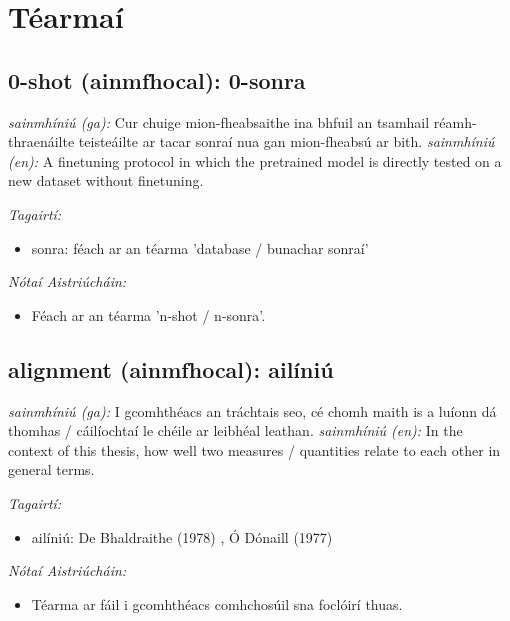 \documentclass{article}
\begin{document}
\newpage \section{Téarmaí}
\subsection*{0-shot (ainmfhocal): 0-sonra} 
 \noindent \textit{sainmhíniú (ga):} Cur chuige mion-fheabsaithe ina bhfuil an tsamhail réamh-thraenáilte teisteáilte ar tacar sonraí nua gan mion-fheabsú ar bith.
\newline\newline
 \noindent \textit{sainmhíniú (en):} A finetuning protocol in which the pretrained model is directly tested on a new dataset without finetuning.
\newline

 \noindent \textit{Tagairtí:}
\begin{itemize}
	\item sonra: féach ar an téarma 'database / bunachar sonraí'
\end{itemize}

 \noindent \textit{Nótaí Aistriúcháin:}
\begin{itemize}
	\item Féach ar an téarma 'n-shot / n-sonra'.
\end{itemize}


\subsection*{alignment (ainmfhocal): ailíniú} 
 \noindent \textit{sainmhíniú (ga):} I gcomhthéacs an tráchtais seo, cé chomh maith is a luíonn dá thomhas / cáilíochtaí le chéile ar leibhéal leathan.
\newline\newline
 \noindent \textit{sainmhíniú (en):} In the context of this thesis, how well two measures / quantities relate to each other in general terms.
\newline

 \noindent \textit{Tagairtí:}
\begin{itemize}
	\item ailíniú: De Bhaldraithe (1978) \cite{de-bhaldraithe}, Ó Dónaill (1977) \cite{odonaill}
\end{itemize}

 \noindent \textit{Nótaí Aistriúcháin:}
\begin{itemize}
	\item Téarma ar fáil i gcomhthéacs comhchosúil sna foclóirí thuas.
\end{itemize}
\end{document}
